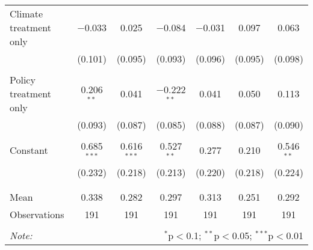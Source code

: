 \begin{tabular}{@{\extracolsep{5pt}}lcccccc}
 Climate treatment only & $-$0.033 & 0.025 & $-$0.084 & $-$0.031 & 0.097 & 0.063 \\ 
  & (0.101) & (0.095) & (0.093) & (0.096) & (0.095) & (0.098) \\ 
  & & & & & & \\ 
 Policy treatment only & 0.206$^{**}$ & 0.041 & $-$0.222$^{**}$ & 0.041 & 0.050 & 0.113 \\ 
  & (0.093) & (0.087) & (0.085) & (0.088) & (0.087) & (0.090) \\ 
  & & & & & & \\ 
 Constant & 0.685$^{***}$ & 0.616$^{***}$ & 0.527$^{**}$ & 0.277 & 0.210 & 0.546$^{**}$ \\ 
  & (0.232) & (0.218) & (0.213) & (0.220) & (0.218) & (0.224) \\ 
  & & & & & & \\ 
\hline \\[-1.8ex] 
Mean & 0.338 & 0.282 & 0.297 & 0.313 & 0.251 & 0.292 \\ 
Observations & 191 & 191 & 191 & 191 & 191 & 191 \\ 
\hline 
\hline \\[-1.8ex] 
\textit{Note:}  & \multicolumn{6}{r}{$^{*}$p$<$0.1; $^{**}$p$<$0.05; $^{***}$p$<$0.01} \\ 
\end{tabular} 
